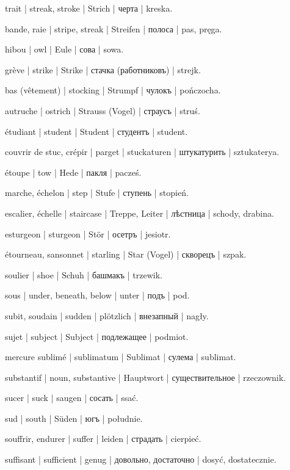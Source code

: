 \begin{outdent}{1em}
\uvsubentry{}
trait | streak, stroke | Strich | черта | kreska.

bande, raie | stripe, streak | Streifen | полоса | pas, pręga.

hibou | owl | Eule | сова | sowa.

grève | strike | Strike | стачка (работниковъ) | strejk.

bas (vêtement) | stocking | Strumpf | чулокъ | pończocha.

autruche | ostrich | Strauss (Vogel) | страусъ | struś.

étudiant | student | Student | студентъ | student.

couvrir de stuc, crépir | parget | stuckaturen | штукатурить | sztukaterya.

étoupe | tow | Hede | пакля | pacześ.

marche, échelon | step | Stufe | ступень | stopień.

\uvsubentry{}
escalier, échelle | staircase | Treppe, Leiter | лѣстница | schody, drabina.

esturgeon | sturgeon | Stör | осетръ | jesiotr.

étourneau, sansonnet | starling | Star (Vogel) | скворецъ | szpak.

soulier | shoe | Schuh | башмакъ | trzewik.

sous | under, beneath, below | unter | подъ | pod.

subit, soudain | sudden | plötzlich | внезапный | nagły.

sujet | subject | Subject | подлежащее | podmiot.

mercure sublimé | sublimatum | Sublimat | сулема | sublimat.

substantif | noun, substantive | Hauptwort | существительное | rzeczownik.

sucer | suck | saugen | сосать | ssać.

sud | south | Süden | югъ | południe.

souffrir, endurer | suffer | leiden | страдать | cierpieć.

suffisant | sufficient | genug | довольно, достаточно | dosyć, dostatecznie.


\end{outdent}
